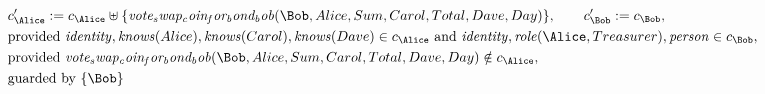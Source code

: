 \begin{align*}
&
c'_
{
\Alice
}
 := 
c_
{
\Alice
}
 \uplus 
\{
\mathit{
vote_swap_coin_for_bond_bob
}
(
\Bob
,
Alice
,
Sum
,
Carol
,
Total
,
Dave
,
Day
)
\}
, \qquad 
c'_
{
\Bob
}
 := 
c_
{
\Bob
}
,\\
&
\text{provided } 
\mathit{
identity
}
,
\mathit{
knows
}
(
Alice
)
,
\mathit{
knows
}
(
Carol
)
,
\mathit{
knows
}
(
Dave
)
 \in c_
{
\Alice
}
 \text{ and } 
\mathit{
identity
}
,
\mathit{
role
}
(
\Alice
,
Treasurer
)
,
\mathit{
person
}
 \in c_
{
\Bob
}
,\\
&
\text{provided } 
\mathit{
vote_swap_coin_for_bond_bob
}
(
\Bob
,
Alice
,
Sum
,
Carol
,
Total
,
Dave
,
Day
)
 \notin c_
{
\Alice
}
,\\
&
\text{guarded by } \{
\Bob
\}
\end{align*}

